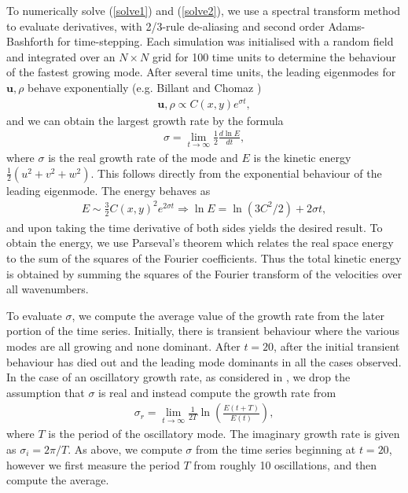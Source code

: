 To numerically solve (\ref{solve1}) and (\ref{solve2}), we use a spectral transform method to evaluate derivatives, with 2/3-rule de-aliasing and second order Adams-Bashforth for time-stepping. Each simulation was initialised with a random field and integrated over an $N\times N$ grid for 100 time units to determine the behaviour of the fastest growing mode. After several time units, the leading eigenmodes for $\bm{u},\rho$ behave exponentially (e.g. Billant and Chomaz \cite{bc2000c})
\begin{align}
\bm{u},\rho \propto C(x,y)e^{\sigma t},
\end{align}
and we can obtain the largest growth rate by the formula
\begin{align}
\sigma = \lim_{t\rightarrow\infty}\frac{1}{2}\frac{d\ln E}{dt}\label{sigma1},
\end{align}
where $\sigma$ is the real growth rate of the mode and $E$ is the kinetic energy $\frac{1}{2}(u^{2}+v^{2}+w^{2})$. This follows directly from the exponential behaviour of the leading eigenmode. The energy behaves as
\begin{align}
E \sim \frac{3}{2}C(x,y)^{2}e^{2\sigma t} \Rightarrow \ln E = \ln(3C^{2}/2) + 2\sigma t,
\end{align}
and upon taking the time derivative of both sides yields the desired result. To obtain the energy, we use Parseval's theorem which relates the real space energy to the sum of the squares of the Fourier coefficients. Thus the total kinetic energy is obtained by summing the squares of the Fourier transform of the velocities over all wavenumbers. 

To evaluate $\sigma$, we compute the average value of the growth rate from the later portion of the time series. Initially, there is transient behaviour where the various modes are all growing and none dominant. After $t=20$, after the initial transient behaviour has died out and the leading mode dominants in all the cases observed. In the case of an oscillatory growth rate, as considered in \cite{bc1999}, we drop the assumption that $\sigma$ is real and instead compute the growth rate from
\begin{align}
\sigma_{r} = \lim_{t\rightarrow \infty} \frac{1}{2T}\ln\left(\frac{E(t+T)}{E(t)}\right)\label{sigma2},
\end{align}
where $T$ is the period of the oscillatory mode. The imaginary growth rate is given as $\sigma_{i}=2\pi/T$. As above, we compute $\sigma$ from the time series beginning at $t=20$, however we first measure the period $T$ from roughly 10 oscillations, and then compute the average.  


